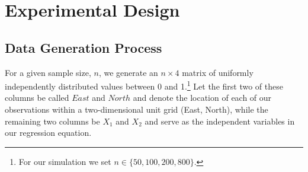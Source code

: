 \documentclass{article}\usepackage[]{graphicx}\usepackage[]{color}
\begin{document}
% 
% 
% 
% 
% 
% 
% 
% 
% 

\section{Experimental Design}

\subsection{Data Generation Process}

For a given sample size, $n$, we generate an $n \times 4$ matrix of  uniformly independently distributed values between 0 and 1.\footnote{For our simulation we set $n \in \{50, 100, 200, 800\}$.} Let the first two of these columns be called $East$ and $North$ and denote the location of each of our observations within a two-dimensional unit grid (East, North), while the remaining two columns be $X_1$ and $X_2$ and serve as the independent variables in our regression equation.
\end{document}
